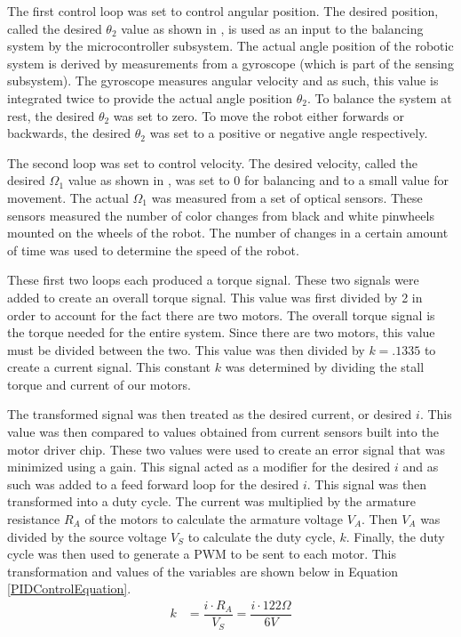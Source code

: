 \documentclass[11pt]{report}
\begin{document}
\begin{spacing}{1.5}
        The first control loop was set to control angular position.  The desired position, called the desired $\theta_2$ value as shown in \cite{Groff}, is used as an input to the balancing system by the microcontroller subsystem. The actual angle position of the robotic system is derived by measurements from a gyroscope (which is part of the sensing subsystem). The gyroscope measures angular velocity and as such, this value is integrated twice to provide the actual angle position $\theta_2$. To balance the system at rest, the desired $\theta_2$ was set to zero. To move the robot either forwards or backwards, the desired $\theta_2$ was set to a positive or negative angle respectively. 
        
        The second loop was set to control velocity.  The desired velocity, called the desired $\Omega_1$ value as shown in \cite{Groff}, was set to 0 for balancing and to a small value for movement.  The actual $\Omega_1$ was measured from a set of optical sensors.  These sensors measured the number of color changes from black and white pinwheels mounted on the wheels of the robot.  The number of changes in a certain amount of time was used to determine the speed of the robot.  
        
        These first two loops each produced a torque signal.  These two signals were added to create an overall torque signal.  This value was first divided by 2 in order to account for the fact there are two motors.  The overall torque signal is the torque needed for the entire system.  Since there are two motors, this value must be divided between the two.  This value was then divided by $k = .1335$ to create a current signal.  This constant $k$ was determined by dividing the stall torque and current of our motors.
        
        The transformed signal was then treated as the desired current, or desired $i$.  This value was then compared to values obtained from current sensors built into the motor driver chip.  These two values were used to create an error signal that was minimized using a gain.  This signal acted as a modifier for the desired $i$ and as such was added to a feed forward loop for the desired $i$.  This signal was then transformed into a duty cycle.  The current was multiplied by the armature resistance $R_A$ of the motors to calculate the armature voltage $V_A$.  Then $V_A$ was divided by the source voltage $V_S$ to calculate the duty cycle, $k$.  Finally, the duty cycle was then used to generate a PWM to be sent to each motor.  This transformation and values of the variables are shown below in Equation \ref{PIDControlEquation}.
        \begin{align}
    k &= \dfrac{i \cdot  R_A}{V_S} = \dfrac{i \cdot 122 \Omega}{6 V} \label{PIDControlEquation}
\end{align}


\end{spacing}
\end{document}
